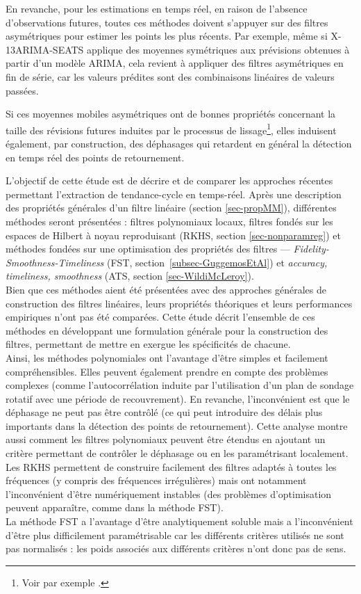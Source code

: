\documentclass[
  12pt,
  a4paper,french]{article}
\newcommand\1{\mathds{1}}
\begin{document}
En revanche, pour les estimations en temps réel, en raison de l'absence d'observations futures, toutes ces méthodes doivent s'appuyer sur des filtres asymétriques pour estimer les points les plus récents.
Par exemple, même si X-13ARIMA-SEATS applique des moyennes symétriques aux prévisions obtenues à partir d'un modèle ARIMA, cela revient à appliquer des filtres asymétriques en fin de série, car les valeurs prédites sont des combinaisons linéaires de valeurs passées.

Si ces moyennes mobiles asymétriques ont de bonnes propriétés concernant la taille des révisions futures induites par le processus de lissage\footnote{Voir par exemple \textcite{pierce1980SA}.}, elles induisent également, par construction, des déphasages qui retardent en général la détection en temps réel des points de retournement.

L'objectif de cette étude est de décrire et de comparer les approches récentes permettant l'extraction de tendance-cycle en temps-réel.
Après une description des propriétés générales d'un filtre linéaire (section \ref{sec-propMM}), différentes méthodes seront présentées :
filtres polynomiaux locaux, filtres fondés sur les espaces de Hilbert à noyau reproduisant (RKHS, section \ref{sec-nonparamreg}) et méthodes fondées sur une optimisation des propriétés des filtres --- \emph{Fidelity-Smoothness-Timeliness} (FST, section~\ref{subsec-GuggemosEtAl}) et \emph{accuracy, timeliness, smoothness} (ATS, section \ref{sec-WildiMcLeroy}).\\
Bien que ces méthodes aient été présentées avec des approches générales de construction des filtres linéaires, leurs propriétés théoriques et leurs performances empiriques n'ont pas été comparées.
Cette étude décrit l'ensemble de ces méthodes en développant une formulation générale pour la construction des filtres, permettant de mettre en exergue les spécificités de chacune.\\
Ainsi, les méthodes polynomiales ont l'avantage d'être simples et facilement compréhensibles.
Elles peuvent également prendre en compte des problèmes complexes (comme l'autocorrélation induite par l'utilisation d'un plan de sondage rotatif avec une période de recouvrement).
En revanche, l'inconvénient est que le déphasage ne peut pas être contrôlé (ce qui peut introduire des délais plus importants dans la détection des points de retournement).
Cette analyse montre aussi comment les filtres polynomiaux peuvent être étendus en ajoutant un critère permettant de contrôler le déphasage ou en les paramétrisant localement.\\
Les RKHS permettent de construire facilement des filtres adaptés à toutes les fréquences (y compris des fréquences irrégulières) mais ont notamment l'inconvénient d'être numériquement instables (des problèmes d'optimisation peuvent apparaître, comme dans la méthode FST).\\
La méthode FST a l'avantage d'être analytiquement soluble mais a l'inconvénient d'être plus difficilement paramétrisable car les différents critères utilisés ne sont pas normalisés : les poids associés aux différents critères n'ont donc pas de sens.
\end{document}
